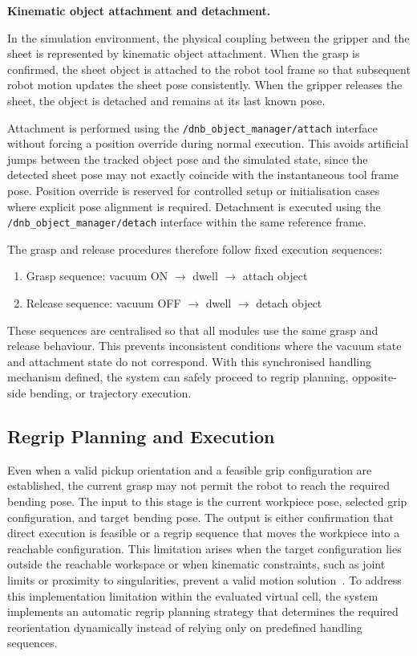 \label{sec:kinematic-object-attachment-detachment}
\noindent\textbf{Kinematic object attachment and detachment.}

In the simulation environment, the physical coupling between the gripper and the sheet is represented by kinematic object attachment. When the grasp is confirmed, the sheet object is attached to the robot tool frame so that subsequent robot motion updates the sheet pose consistently. When the gripper releases the sheet, the object is detached and remains at its last known pose.

Attachment is performed using the \texttt{/dnb\_object\_manager/attach} interface without forcing a position override during normal execution. This avoids artificial jumps between the tracked object pose and the simulated state, since the detected sheet pose may not exactly coincide with the instantaneous tool frame pose. Position override is reserved for controlled setup or initialisation cases where explicit pose alignment is required. Detachment is executed using the \texttt{/dnb\_object\_manager/detach} interface within the same reference frame.

The grasp and release procedures therefore follow fixed execution sequences:

\begin{enumerate}
\item Grasp sequence: vacuum ON $\rightarrow$ dwell $\rightarrow$ attach object
\item Release sequence: vacuum OFF $\rightarrow$ dwell $\rightarrow$ detach object
\end{enumerate}

These sequences are centralised so that all modules use the same grasp and release behaviour. This prevents inconsistent conditions where the vacuum state and attachment state do not correspond. With this synchronised handling mechanism defined, the system can safely proceed to regrip planning, opposite-side bending, or trajectory execution.


\subsection{Regrip Planning and Execution}
\label{sec:regrip}

Even when a valid pickup orientation and a feasible grip configuration are established, the current grasp may not permit the robot to reach the required bending pose. The input to this stage is the current workpiece pose, selected grip configuration, and target bending pose. The output is either confirmation that direct execution is feasible or a regrip sequence that moves the workpiece into a reachable configuration. This limitation arises when the target configuration lies outside the reachable workspace or when kinematic constraints, such as joint limits or proximity to singularities, prevent a valid motion solution~\cite{lynch2017modern}. To address this implementation limitation within the evaluated virtual cell, the system implements an automatic regrip planning strategy that determines the required reorientation dynamically instead of relying only on predefined handling sequences.

